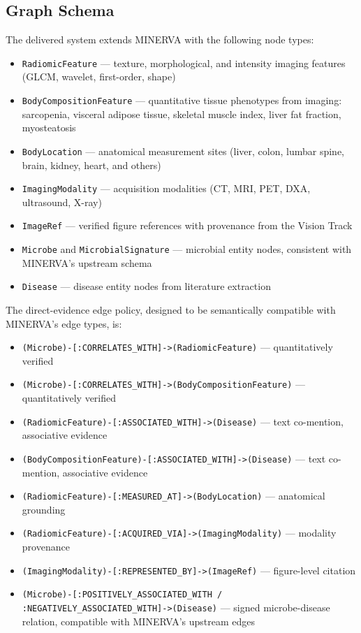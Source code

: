 \documentclass[12pt, letterpaper]{article}
\begin{document}
\subsection{Graph Schema}

The delivered system extends MINERVA with the following node types:

\begin{itemize}
    \item \texttt{RadiomicFeature} — texture, morphological, and intensity imaging features (GLCM, wavelet, first-order, shape)
    \item \texttt{BodyCompositionFeature} — quantitative tissue phenotypes from imaging: sarcopenia, visceral adipose tissue, skeletal muscle index, liver fat fraction, myosteatosis
    \item \texttt{BodyLocation} — anatomical measurement sites (liver, colon, lumbar spine, brain, kidney, heart, and others)
    \item \texttt{ImagingModality} — acquisition modalities (CT, MRI, PET, DXA, ultrasound, X-ray)
    \item \texttt{ImageRef} — verified figure references with provenance from the Vision Track
    \item \texttt{Microbe} and \texttt{MicrobialSignature} — microbial entity nodes, consistent with MINERVA's upstream schema
    \item \texttt{Disease} — disease entity nodes from literature extraction
\end{itemize}

The direct-evidence edge policy, designed to be semantically compatible with MINERVA's edge types, is:

\begin{itemize}
    \item \texttt{(Microbe)-[:CORRELATES\_WITH]->(RadiomicFeature)} — quantitatively verified
    \item \texttt{(Microbe)-[:CORRELATES\_WITH]->(BodyCompositionFeature)} — quantitatively verified
    \item \texttt{(RadiomicFeature)-[:ASSOCIATED\_WITH]->(Disease)} — text co-mention, associative evidence
    \item \texttt{(BodyCompositionFeature)-[:ASSOCIATED\_WITH]->(Disease)} — text co-mention, associative evidence
    \item \texttt{(RadiomicFeature)-[:MEASURED\_AT]->(BodyLocation)} — anatomical grounding
    \item \texttt{(RadiomicFeature)-[:ACQUIRED\_VIA]->(ImagingModality)} — modality provenance
    \item \texttt{(ImagingModality)-[:REPRESENTED\_BY]->(ImageRef)} — figure-level citation
    \item \texttt{(Microbe)-[:POSITIVELY\_ASSOCIATED\_WITH / :NEGATIVELY\_ASSOCIATED\_WITH]->(Disease)} — signed microbe-disease relation, compatible with MINERVA's upstream edges
\end{itemize}
\end{document}
